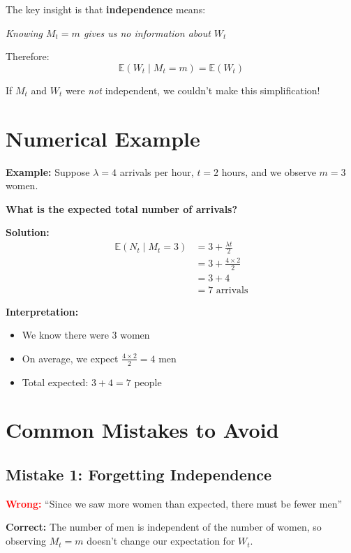 \documentclass[11pt]{article}
\begin{document}
The key insight is that \textbf{independence} means:
\begin{center}
\textit{Knowing $M_t = m$ gives us no information about $W_t$}
\end{center}

Therefore:
\[
\mathbb{E}(W_t \mid M_t = m) = \mathbb{E}(W_t)
\]

If $M_t$ and $W_t$ were \textit{not} independent, we couldn't make this simplification!

\section{Numerical Example}

\textbf{Example:} Suppose $\lambda = 4$ arrivals per hour, $t = 2$ hours, and we observe $m = 3$ women.

\textbf{What is the expected total number of arrivals?}

\textbf{Solution:}
\begin{align*}
\mathbb{E}(N_t \mid M_t = 3) &= 3 + \frac{\lambda t}{2} \\
&= 3 + \frac{4 \times 2}{2} \\
&= 3 + 4 \\
&= 7 \text{ arrivals}
\end{align*}

\textbf{Interpretation:}
\begin{itemize}
    \item We know there were 3 women
    \item On average, we expect $\frac{4 \times 2}{2} = 4$ men
    \item Total expected: $3 + 4 = 7$ people
\end{itemize}

\section{Common Mistakes to Avoid}

\subsection{Mistake 1: Forgetting Independence}

\textcolor{red}{\textbf{Wrong:}} ``Since we saw more women than expected, there must be fewer men''

\textcolor{green!60!black}{\textbf{Correct:}} The number of men is independent of the number of women, so observing $M_t = m$ doesn't change our expectation for $W_t$.
\end{document}
